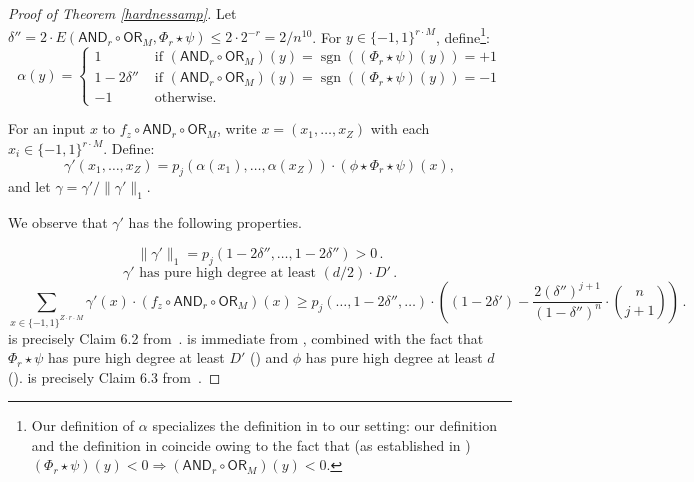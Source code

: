 \documentclass{toc}
\newcommand{\sgn}{\mathrm{sign}}
\newcommand{\OR}{\mathsf{ OR}}
\newcommand{\bits}{\{-1,1\}}
\newcommand{\ls}{\star}
\newcommand{\AND}{\mathsf{AND}}
\renewcommand{\sgn}{\operatorname{sgn}}
\begin{document}
\begin{proof}[Proof of Theorem \ref{hardnessamp}]
	Let $\delta''=2 \cdot E(\AND_r \circ \OR_M, \Phi_r \ls \psi) \leq 2 \cdot 2^{-r} = 2/n^{10}$.
	For $y \in \bits^{r \cdot M}$, define\footnote{Our definition of $\alpha$ specializes the definition in \cite[Page 39]{sherstovdp}
		to our setting: our definition and the definition in \cite[Page 39]{sherstovdp} coincide owing to the fact that (as established in \cite[Theorem 1]{bt14})
		$(\Phi_r \ls \psi)(y) < 0 \Longrightarrow \left(\AND_r \circ \OR_M\right)(y) < 0$.}:
	$$\alpha(y)=\begin{cases} 1 & \text { if } (\AND_r \circ \OR_M)(y) = \sgn((\Phi_r \ls \psi)(y)) = +1\\
	1-2\delta'' & \text { if } (\AND_r \circ \OR_M)(y) = \sgn((\Phi_r \ls \psi)(y)) = -1\\
	-1 & \text{ otherwise.} \end{cases}$$

	For an input $x$ to $f_z \circ \AND_{r} \circ \OR_M$, 
	write $x=(x_1, \dots, x_Z)$ with each $x_i \in \bits^{r \cdot M}$. 
	Define:
	$$\gamma'(x_1, \dots, x_Z) = p_j\left(\alpha(x_1), \dots, \alpha(x_Z)\right) \cdot \left( \phi \ls \Phi_r \ls \psi\right) (x),$$
	and let $\gamma = \gamma'/\|\gamma'\|_1$.
	
	We observe that $\gamma'$ has the following properties. %
	
	\begin{equation}
	\label{gammaprimeprop1}
	\|\gamma'\|_1 = p_j(1-2\delta'', \dots, 1-2\delta'') > 0\,.
	\end{equation}
	\begin{equation}
	\label{gammaprimeprop2}
	\gamma' \text{ has pure high degree at least } (d/2) \cdot D'\,.
	\end{equation}
	\begin{equation}
	\label{gammaprimeprop3}
	\sum_{x \in \bits^{Z \cdot r \cdot M}} \gamma'(x) \cdot \left(f_z \circ \AND_r \circ \OR_M\right)(x) \geq p_j\left(\dots, 1-2\delta'', \dots\right) \cdot \left( (1-2\delta') - \frac{2 (\delta'')^{j+1}}{(1-\delta'')^n} \cdot {n \choose j+1}\right)\,.
	\end{equation}
	 is precisely Claim 6.2 from~\cite{sherstovdp}.
	 is immediate from \cite[Equation 6.7]{sherstovdp}, combined
with the fact that $\Phi_r \ls \psi$ has pure high degree at least $D'$
     ()
	and $\phi$ has pure high degree at least $d$ 
	(). 
	 is precisely Claim 6.3 from~\cite{sherstovdp}. 
	

\end{proof}
\end{document}
